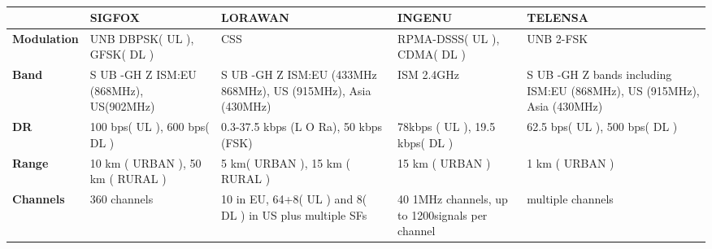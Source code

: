 \begin{table}[h!]
\scriptsize
	\begin{tabulary}{\textwidth}{L|L|L|L|L}
	\                                            & \textbf{SIGFOX}                               & \textbf{LORAWAN}                                              & \textbf{INGENU}                                 & \textbf{TELENSA} \\\hline                                                              
	\textbf{Modulation}                          & UNB DBPSK( UL ), GFSK( DL )                   & CSS                                                           & RPMA-DSSS( UL ), CDMA( DL )                     & UNB 2-FSK \\\hline                                                             
	\textbf{Band}                                & S UB -GH Z ISM:EU (868MHz), US(902MHz)        & S UB -GH Z ISM:EU (433MHz 868MHz), US (915MHz), Asia (430MHz) & ISM 2.4GHz                                      & S UB -GH Z bands including ISM:EU (868MHz), US (915MHz), Asia (430MHz) \\\hline
	\textbf{\ac{DR}}                             & 100 bps( UL ), 600 bps( DL )                  & 0.3-37.5 kbps (L O Ra), 50 kbps (FSK)                         & 78kbps ( UL ), 19.5 kbps( DL )                  & 62.5 bps( UL ), 500 bps( DL ) \\\hline                                         
	\textbf{Range}                               & 10 km ( URBAN ), 50 km ( RURAL )              & 5 km( URBAN ), 15 km ( RURAL )                                & 15 km ( URBAN )                                 & 1 km ( URBAN ) \\\hline                                                        
	\textbf{Channels}                            & 360 channels                                  & 10 in EU, 64+8( UL ) and 8( DL ) in US plus multiple SFs      & 40 1MHz channels, up to 1200signals per channel & multiple channels \\\hline                                                     
	\end{tabulary}
\caption{\label{tab:edesf} \cite{raza_low_22}}
\end{table}


